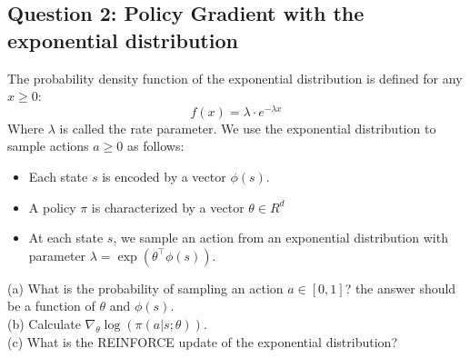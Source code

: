 \documentclass[11pt]{article}
\begin{document}
\subsection{Question 2: Policy Gradient with the exponential distribution}
The probability density function of the exponential distribution is defined for any $x\geq 0$:
\[
f(x)=\lambda \cdot e^{-\lambda x}
\]
Where $\lambda$ is called the rate parameter.
We use the  exponential distribution to sample actions $a\geq 0$ as follows:
\begin{itemize}
\item Each state $s$ is encoded by a vector $\phi(s)$.
\item A policy $\pi$ is characterized by a vector $\theta\in R^d$
\item At each state $s$, we sample an action from an exponential distribution with  parameter $\lambda= \exp(\theta^\intercal \phi(s))$.
\end{itemize}
(a) What is the probability of sampling an action $a\in[0,1]$? the answer should be a function of $\theta$ and $\phi(s)$.\\
(b) Calculate $\nabla_\theta \log(\pi(a|s;\theta))$. \\
(c) What is the REINFORCE update of the exponential distribution?







\end{document}
